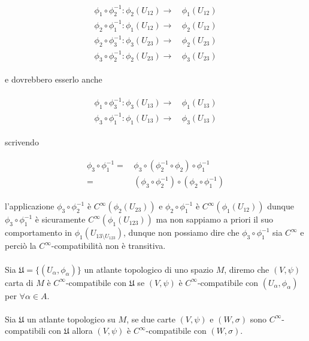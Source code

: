 \begin{align}
	\begin{split}
		\phi_{1} \circ \phi_{2}^{-1} : \phi_{2}(U_{12}) \to& \, \phi_{1}(U_{12})\\
		\phi_{2} \circ \phi_{1}^{-1} : \phi_{1}(U_{12}) \to& \, \phi_{2}(U_{12})\\
		\phi_{2} \circ \phi_{3}^{-1} : \phi_{3}(U_{23}) \to& \, \phi_{2}(U_{23})\\
		\phi_{3} \circ \phi_{2}^{-1} : \phi_{2}(U_{23}) \to& \, \phi_{3}(U_{23})
	\end{split}
\end{align}

e dovrebbero esserlo anche

\begin{align}
	\begin{split}
		\phi_{1} \circ \phi_{3}^{-1} : \phi_{3}(U_{13}) \to& \, \phi_{1}(U_{13})\\
		\phi_{3} \circ \phi_{1}^{-1} : \phi_{1}(U_{13}) \to& \, \phi_{3}(U_{13})
	\end{split}
\end{align}

scrivendo

\begin{align}
	\begin{split}
		\phi_{3} \circ \phi_{1}^{-1} =& \, \phi_{3} \circ (\phi_{2}^{-1} \circ \phi_{2}) \circ \phi_{1}^{-1}\\
		=& \, (\phi_{3} \circ \phi_{2}^{-1}) \circ (\phi_{2} \circ \phi_{1}^{-1})
	\end{split}
\end{align}

l'applicazione $ \phi_{3} \circ \phi_{2}^{-1} $ è $ C^{\infty}(\phi_{2}(U_{23})) $ e $ \phi_{2} \circ \phi_{1}^{-1} $ è $ C^{\infty}(\phi_{1}(U_{12})) $ dunque $ \phi_{3} \circ \phi_{1}^{-1} $ è sicuramente $ C^{\infty}(\phi_{1}(U_{123})) $ ma non sappiamo a priori il suo comportamento in $ \phi_{1}(U_{13 \setminus U_{123}}) $, dunque non possiamo dire che $ \phi_{3} \circ \phi_{1}^{-1} $ sia $ C^{\infty} $ e perciò la $ C^{\infty} $-compatibilità non è transitiva.\\\\
%
Sia $ \mathfrak{U} = \{(U_{\alpha},\phi_{\alpha})\} $ un atlante topologico di uno spazio $ M $, diremo che $ (V,\psi) $ carta di $ M $ è $ C^{\infty} $-compatibile con $ \mathfrak{U} $ se $ (V,\psi) $ è $ C^{\infty} $-compatibile con $ (U_{\alpha},\phi_{\alpha}) $ per $ \forall \alpha \in A $.\\\\
%
Sia $ \mathfrak{U} $ un atlante topologico su $ M $, se due carte $ (V,\psi) $ e $ (W,\sigma) $ sono $ C^{\infty} $-compatibili con $ \mathfrak{U} $ allora $ (V,\psi) $ è $ C^{\infty} $-compatibile con $ (W,\sigma) $.

